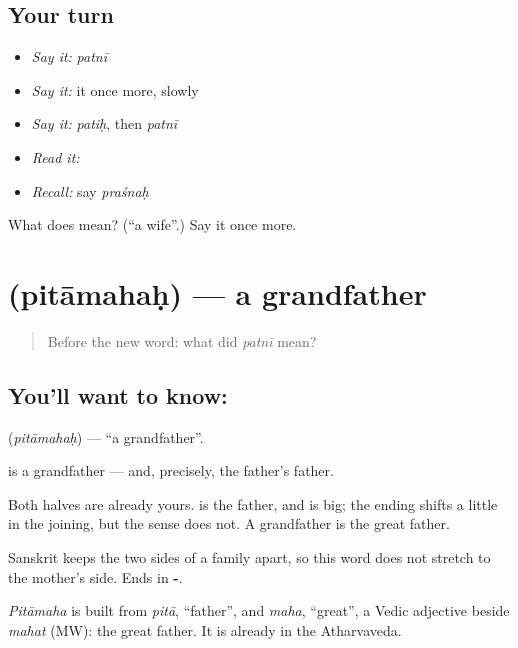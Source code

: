 \subsection*{Your turn}
\begin{itemize}
\raggedright
  \item \emph{Say it:} \emph{patnī}
  \item \emph{Say it:} it once more, slowly
  \item \emph{Say it:} \emph{patiḥ}, then \emph{patnī}
  \item \emph{Read it:} \textbf{}
  \item \emph{Recall:} say \emph{praśnaḥ}
\end{itemize}

\begin{tcolorbox}[breakable,colback=teal!4,colframe=teal!35!black,title={Before you move on}]
What does  mean? (\textquotedblleft{}a wife\textquotedblright{}.) Say it once more.
\end{tcolorbox}
\section[\texorpdfstring{\sk{पितामहः} (pitāmahaḥ)}{पितामहः (pitāmahaḥ)}]{ (pitāmahaḥ) — a grandfather}

\label{lesson:SA-C51-grandfather}



\begin{quote}
Before the new word: what did \emph{patnī} mean?
\end{quote}

\subsection*{You'll want to know: }
\textbf{} (\emph{pitāmahaḥ}) — \textquotedblleft{}a grandfather\textquotedblright{}.

\textbf{} is a grandfather — and, precisely, the father's father.

Both halves are already yours.  is the father, and  is big; the ending shifts a little in the joining, but the sense does not. A grandfather is the great father.

Sanskrit keeps the two sides of a family apart, so this word does not stretch to the mother's side. Ends in \textbf{-}.

\begin{cousinweb}
\emph{Pitāmaha} is built from \emph{pitā}, \textquotedblleft{}father\textquotedblright{}, and \emph{maha}, \textquotedblleft{}great\textquotedblright{}, a Vedic adjective beside \emph{mahat} (MW): the great father. It is already in the Atharvaveda.
\end{cousinweb}

